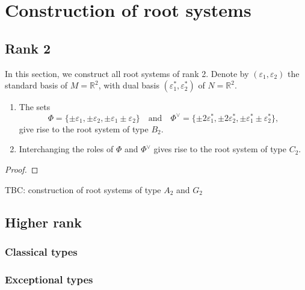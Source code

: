 \chapter{Construction of root systems}
\label{cha:construction-root-systems}
\section{Rank 2}
In this section, we construct all root systems of rank 2. Denote by $(\varepsilon_1, \varepsilon_2)$ the standard basis of $M = \mathbb{R}^2$, 
with dual basis $(\varepsilon_1^*, \varepsilon_2^*)$ of $N = \mathbb{R}^2$.\\

\begin{lemma}
    \label{rank2:construct}
    \begin{enumerate}
        \item The sets 
\[
    \Phi = \{\pm \varepsilon_1, \pm \varepsilon_2, \pm\varepsilon_1\pm\varepsilon_2\} \quad \text{and} \quad
    \Phi^\vee = \{\pm 2\varepsilon^*_1, \pm 2 \varepsilon^*_2, \pm \varepsilon_1^* \pm \varepsilon_2^* \},
\]
give rise to the root system of type $B_2$.
        \item Interchanging the roles of $\Phi$ and $\Phi^\vee$ gives rise to the root system of type $C_2$.
    \end{enumerate}
\end{lemma}
\begin{proof}

\end{proof}


\begin{lemma}
    TBC: construction of root systems of type $A_2$ and $G_2$
\end{lemma}

\section{Higher rank}
\label{sec:higher-rank}
\subsection{Classical types}
\label{subsec:classical-types}
\subsection{Exceptional types}